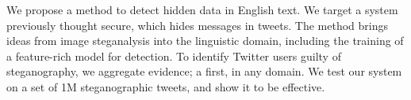 We propose a method to detect hidden data in English text. We target a system previously thought secure, which hides messages in tweets. The method brings ideas from image steganalysis into the linguistic domain, including the training of a feature-rich model for detection. To identify Twitter users guilty of steganography, we aggregate evidence; a first, in any domain. We test our system on a set of 1M steganographic tweets, and show it to be effective.
